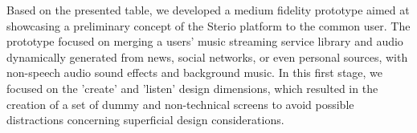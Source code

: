 {{Based on the presented table, we developed a medium fidelity prototype aimed at showcasing a preliminary concept of the Sterio platform to the common user. The prototype focused on merging a users' music streaming service library and audio dynamically generated from news, social networks, or even personal sources, with non-speech audio sound effects and background music. In this first stage, we focused on the 'create' and 'listen' design dimensions, which resulted in the creation of a set of dummy and non-technical screens to avoid possible distractions concerning superficial design considerations.

\begin{figure}[htbp]
	\centering
	 \qquad
	 \qquad

\end{figure}}}
